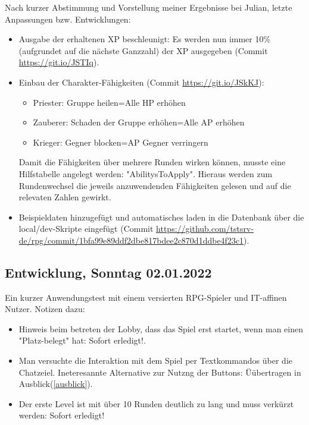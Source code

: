 Nach kurzer Abstimmung und Vorstellung meiner Ergebnisse bei Julian, letzte Anpassungen bzw. Entwicklungen: 

\begin{itemize}
    \item Ausgabe der erhaltenen XP beschleunigt: Es werden nun immer 10\% (aufgrundet auf die nächste Ganzzahl) der XP ausgegeben (Commit \url{https://git.io/JSTIq}).
    \item Einbau der Charakter-Fähigkeiten (Commit \url{https://git.io/JSkKJ}):
    \begin{itemize}
        \item Priester: Gruppe heilen=Alle HP erhöhen
        \item Zauberer: Schaden der Gruppe erhöhen=Alle AP erhöhen
        \item Krieger: Gegner blocken=AP Gegner verringern
    \end{itemize} 
    Damit die Fähigkeiten über mehrere Runden wirken können, musste eine Hilfstabelle angelegt werden: "AbilitysToApply". Hieraus werden zum Rundenwechsel die jeweils anzuwendenden Fähigkeiten gelesen und auf die relevaten Zahlen gewirkt. 
    \item Beispieldaten hinzugefügt und automatisches laden in die Datenbank über die local/dev-Skripte eingefügt (Commit \url{https://github.com/tstsrv-de/rpg/commit/1bfa99e89ddf2dbe817bdee2c870d1ddbe4f23c1}).
\end{itemize} 


\subsection{Entwicklung, Sonntag 02.01.2022}

Ein kurzer Anwendungstest mit einem versierten RPG-Spieler und IT-affinen Nutzer. Notizen dazu: 

\begin{itemize}
    \item Hinweis beim betreten der Lobby, dass das Spiel erst startet, wenn man einen "Platz-belegt" hat: Sofort erledigt!. 
    \item Man versuchte die Interaktion mit dem Spiel per Textkommandos über die Chatzeiel. Ineteresannte Alternative zur Nutzng der Buttons: Üübertragen in Ausblick(\ref{ausblick}). 
    \item Der erste Level ist mit über 10 Runden deutlich zu lang und muss verkürzt werden: Sofort erledigt!
\end{itemize}

